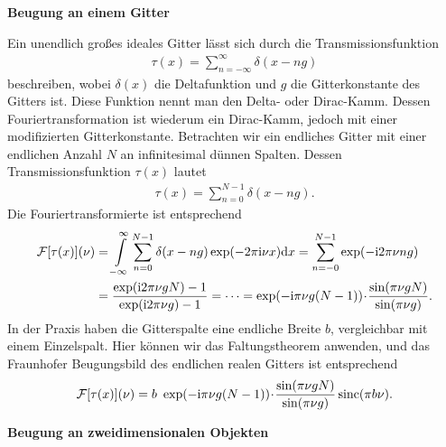 \textbf{Beugung an einem Gitter}

Ein unendlich großes ideales Gitter lässt sich durch die Transmissionsfunktion
\begin{align}
\tau(x)=\sum\limits_{n=-\infty}^\infty \delta(x-ng)
\end{align}
beschreiben, wobei $\delta(x)$ die Deltafunktion und $g$ die Gitterkonstante des Gitters ist. Diese Funktion nennt man den Delta- oder Dirac-Kamm. Dessen Fouriertransformation ist wiederum ein Dirac-Kamm, jedoch mit einer modifizierten Gitterkonstante.
Betrachten wir ein endliches Gitter mit einer endlichen Anzahl $N$ an infinitesimal dünnen Spalten. Dessen Transmissionsfunktion $\tau(x)$ lautet
\begin{align}
\tau(x)=\sum\limits_{n=0}^{N-1} \delta(x-ng).
\end{align}
Die Fouriertransformierte ist entsprechend
\begin{align}
\mathcal{F}[\tau(x)](\nu)&=\int\limits_{-\infty}^{\infty}\sum\limits_{n=0}^{N-1} \delta(x-ng)\exp(-2\pi\mathrm{i}\nu x)\mathrm{d} x=\sum\limits_{n=-0}^{N-1}\exp(-\mathrm{i}2\pi\nu ng)\nonumber\\
&=\frac{\exp(\mathrm{i}2\pi\nu gN)-1}{\exp(\mathrm{i}2\pi\nu g)-1}=\dots =\exp(-\mathrm{i}\pi\nu g(N-1))\!\cdot\! \frac{\sin(\pi\nu gN)}{\sin(\pi\nu g)}.
\end{align}
In der Praxis haben die Gitterspalte eine endliche Breite $b$, vergleichbar mit einem Einzelspalt. Hier können wir das Faltungstheorem anwenden, und das Fraunhofer Beugungsbild des endlichen realen Gitters ist entsprechend
\begin{align}
\mathcal{F}[\tau(x)](\nu)=b~\exp(-\mathrm{i}\pi\nu g(N-1))\!\cdot\! \frac{\sin(\pi\nu gN)}{\sin(\pi\nu g)} \operatorname{sinc}(\pi b\nu).
\end{align}

\textbf{Beugung an zweidimensionalen Objekten}

